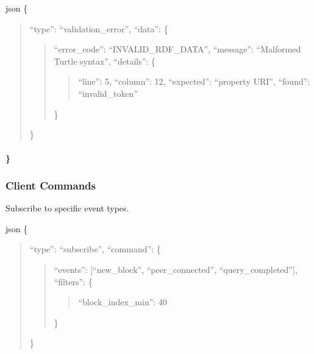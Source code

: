 \documentclass[letterpaper,10pt,english]{sphinxmanual}
\begin{document}
\sphinxAtStartPar
{\color{red}\bfseries{}\textasciigrave{}\textasciigrave{}}{\color{red}\bfseries{}\textasciigrave{}}json
\{
\begin{quote}

\sphinxAtStartPar
“type”: “validation\_error”,
“data”: \{
\begin{quote}

\sphinxAtStartPar
“error\_code”: “INVALID\_RDF\_DATA”,
“message”: “Malformed Turtle syntax”,
“details”: \{
\begin{quote}

\sphinxAtStartPar
“line”: 5,
“column”: 12,
“expected”: “property URI”,
“found”: “invalid\_token”
\end{quote}

\sphinxAtStartPar
\}
\end{quote}

\sphinxAtStartPar
\}
\end{quote}


\paragraph{\}}
\label{\detokenize{api/websocket-api:id55}}

\subsubsection{Client Commands}
\label{\detokenize{api/websocket-api:client-commands}}
\sphinxAtStartPar
Subscribe to specific event types.

\sphinxAtStartPar
{}
{\color{red}\bfseries{}\textasciigrave{}\textasciigrave{}}{\color{red}\bfseries{}\textasciigrave{}}json
\{
\begin{quote}

\sphinxAtStartPar
“type”: “subscribe”,
“command”: \{
\begin{quote}

\sphinxAtStartPar
“events”: {[}“new\_block”, “peer\_connected”, “query\_completed”{]},
“filters”: \{
\begin{quote}

\sphinxAtStartPar
“block\_index\_min”: 40
\end{quote}

\sphinxAtStartPar
\}
\end{quote}

\sphinxAtStartPar
\}
\end{quote}
\end{document}
